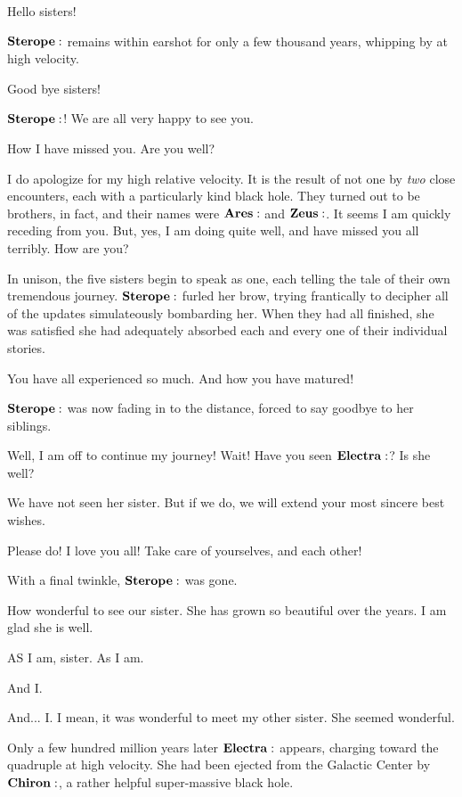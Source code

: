 \Sterope Hello sisters!

$\Sterope$ remains within earshot for only a few thousand years, whipping by at high velocity.

\Sterope Good bye sisters!

\Maia $\Sterope$!  We are all very happy to see you.

\Celaeno How I have missed you.  Are you well?

\Sterope I do apologize for my high relative velocity.  It is the result of not one by \textit{two} close encounters, each with a particularly kind black hole.  They turned out to be brothers, in fact, and their names were $\Ares$ and $\Zeus$.  It seems I am quickly receding from you.  But, yes, I am doing quite well, and have missed you all terribly.  How are you?

In unison, the five sisters begin to speak as one, each telling the tale of their own tremendous journey.  $\Sterope$ furled her brow, trying frantically to decipher all of the updates simulateously bombarding her.  When they had all finished, she was satisfied she had adequately absorbed each and every one of their individual stories.

\Sterope You have all experienced so much.  And how you have matured!  

$\Sterope$ was now fading in to the distance, forced to say goodbye to her siblings.

\Sterope Well, I am off to continue my journey!  Wait!  Have you seen $\Electra$?  Is she well?

\Merope We have not seen her sister.  But if we do, we will extend your most sincere best wishes.

\Sterope Please do!  I love you all!  Take care of yourselves, and each other!

With a final twinkle, $\Sterope$ was gone.

\Maia How wonderful to see our sister.  She has grown so beautiful over the years.  I am glad she is well.

\Merope AS I am, sister.  As I am.

\Celaeno And I.

\Lacedaemon And... I.  I mean, it was wonderful to meet my other sister.  She seemed wonderful.

Only a few hundred million years later $\Electra$ appears, charging toward the quadruple at high velocity.  She had been ejected from the Galactic Center by $\Chiron$, a rather helpful super-massive black hole.  

